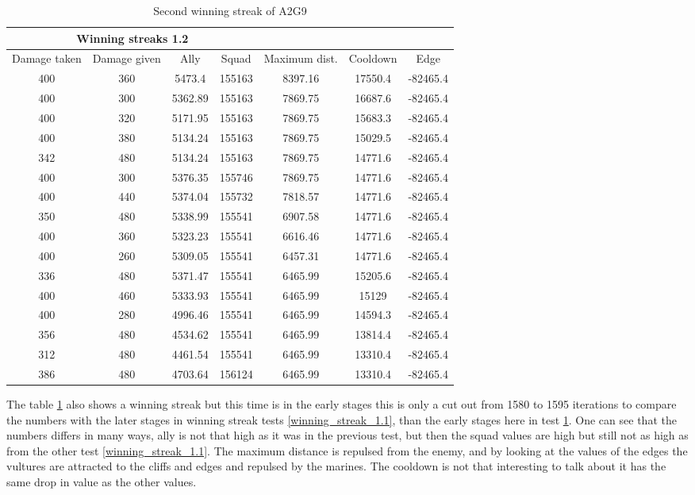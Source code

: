 \begin{centering}
\begin{table}
 \begin{tabular}{|c|c|c|c|c|c|c|}
	\multicolumn{4}{c}{Winning streaks 1.2} \\
	\hline
	Damage taken & Damage given & Ally & Squad & Maximum dist. & Cooldown & Edge \\
	\hline
	400&		360&			5473.4&	 155163&	8397.16&		17550.4&	-82465.4\\
	400&		300&			5362.89& 155163&	7869.75&		16687.6&	-82465.4\\
	400&		320&			5171.95& 155163&	7869.75&		15683.3&	-82465.4\\
	400&		380&			5134.24& 155163&	7869.75&		15029.5&	-82465.4\\
	342&		480&			5134.24& 155163&	7869.75&		14771.6&	-82465.4\\
	400&		300&			5376.35& 155746&	7869.75&		14771.6&	-82465.4\\
	400&		440&			5374.04& 155732&	7818.57&		14771.6&	-82465.4\\
	350&		480&			5338.99& 155541&	6907.58&		14771.6&	-82465.4\\
	400&		360&			5323.23& 155541&	6616.46&		14771.6&	-82465.4\\
	400&		260&			5309.05& 155541&	6457.31&		14771.6&	-82465.4\\
	336&		480&			5371.47& 155541&	6465.99&		15205.6&	-82465.4\\
	400&		460&			5333.93& 155541&	6465.99&		15129& 		-82465.4\\
	400&		280&			4996.46& 155541&	6465.99&		14594.3&	-82465.4\\
	356&		480&			4534.62& 155541&	6465.99&		13814.4&	-82465.4\\
	312&		480&			4461.54& 155541&	6465.99&		13310.4&	-82465.4\\
	386&		480&			4703.64& 156124&	6465.99&		13310.4&	-82465.4\\
	\hline
\end{tabular}

	\label{winning_streak_1.2}
	\caption{Second winning streak of A2G9}
	\end{table}
\end{centering}
The table \ref{winning_streak_1.2} also shows a winning streak but this time is in the early stages this is only a cut out from 1580 to 1595 iterations to compare the numbers with the later stages in winning streak tests \ref{winning_streak_1.1}, than the early stages here in test \ref{winning_streak_1.2}. One can see that the numbers differs in many ways, ally is not that high as it was in the previous test, but then the squad values are high but still not as high as from the other test \ref{winning_streak_1.1}. The maximum distance is repulsed from the enemy, and by looking at the values of the edges the vultures are attracted to the cliffs and edges and repulsed by the marines. The cooldown is not that interesting to talk about it has the same drop in value as the other values.

